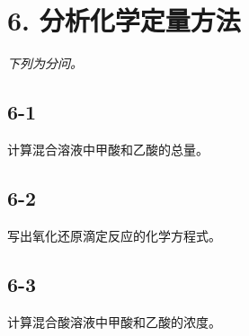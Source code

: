 \section*{6. 分析化学定量方法}
\textit{下列为分问。}

\subsection*{6-1}
计算混合溶液中甲酸和⼄酸的总量。

\subsection*{6-2}
写出氧化还原滴定反应的化学⽅程式。

\subsection*{6-3}
计算混合酸溶液中甲酸和⼄酸的浓度。
